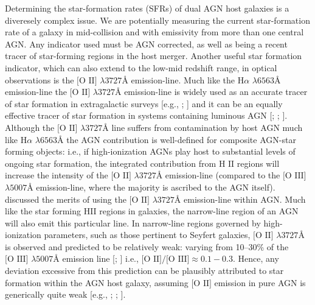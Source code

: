 Determining the star-formation rates (SFRs) of dual AGN host galaxies is a diveresely complex issue. We are potentially measuring the current star-formation rate of a galaxy in mid-collision and with emissivity from more than one central AGN. Any indicator used must be AGN corrected, as well as being a recent tracer of star-forming regions in the host merger. Another useful star formation indicator, which can also extend to the low-mid redshift range, in optical observations is the $\text{[O II]}$ $\lambda{3727}${\AA } emission-line. Much like the $\text{H}\alpha$ $\lambda 6563${\AA } emission-line the $\text{[O II]}$ $\lambda{3727}${\AA } emission-line is widely used as an accurate tracer of star formation in extragalactic surveys [e.g., \cite{Lilly_1996}; \cite{Hippelein_2003}] and it can be an equally effective tracer of star formation in systems containing luminous AGN [\cite{2006ApJ...642..702K}; \cite{2009ApJ...696..396S}; \cite{2012MNRAS.427.2401K}]. Although the $\text{[O II]}$  $\lambda{3727}$Å line suffers from contamination by host AGN much like  $\text{H}\alpha$ $\lambda 6563${\AA } the AGN contribution is well-defined for composite AGN-star forming objects: i.e., if high-ionization AGNs play host to substantial levels of ongoing star formation, the integrated contribution from $\text{H II}$ regions will increase the intensity of the $\text{[O II]}$ $\lambda3727$Å  emission-line (compared to the $\text{[O III]}$ $\lambda5007$Å emission-line, where the majority is ascribed to the AGN itself). \cite{2005ApJ...629..680H} discussed the merits of using the $\text{[O II]}$ $\lambda{3727}$Å emission-line within AGN. Much like the star forming HII regions in galaxies, the narrow-line region of an AGN will also emit this particular line. In narrow-line regions governed by high-ionization parameters, such as those pertinent to Seyfert galaxies, $\text{[O II]}$ $\lambda{3727}$Å is observed and predicted to be relatively weak: varying from 10--30\% of the $\text{[O III]}$ $\lambda{5007}$Å emission line [\cite{Ferland_1986}; \cite{Ho_1993}] i.e., $\text{[O II]/[O III]}\approx{0.1-0.3}$. Hence, any deviation excessive from this prediction can be plausibly attributed to star formation within the AGN host galaxy, assuming $\text{[O II]}$ emission in pure AGN is generically quite weak [e.g., \cite{Ferland_1986}; \cite{Ho_1993}; \cite{2006ApJ...642..702K}]. 

